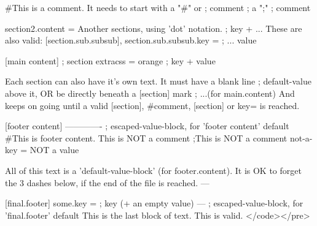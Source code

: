 #This is a comment. It needs to start with a "#" or                     ; comment
; a ";"                                                                 ; comment

section2.content = Another sections, using 'dot' notation.              ; key + ...
These are also valid: [section.sub.subsub], section.sub.subsub.key =    ;      ... value

[main content]                                                          ; section
extracss = orange                                                       ; key + value

Each section can also have it's own text. It must have a blank line     ; default-value 
above it, OR be directly beneath a [section] mark                       ; ...(for main.content)
And keeps on going until a valid [section], #comment, [section] or 
key= is reached.

[footer content]
-------------                                        ; escaped-value-block, for 'footer content' default
#This is footer content. This is NOT a comment
;This is NOT a comment
not-a-key = NOT a value

All of this text is a 'default-value-block' (for footer.content). It is OK
to forget the 3 dashes below, if the end of the file is reached.
---

[final.footer]
some.key =                                           ; key (+ an empty value)
---                                                  ; escaped-value-block, for 'final.footer' default
This is the last block of text. 
This is valid.
</code></pre>






